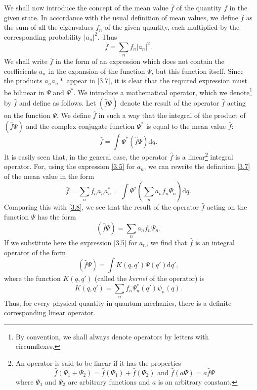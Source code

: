 We shall now introduce the concept of the mean value $ \bar{f} $ of the quantity $ f $ in the given state. In accordance with the usual definition of mean values, we define $ \bar{f} $ as the sum of all the eigenvalues $ f_n $ of the given quantity, each multiplied by the corresponding probability $ |a_n|^2 $. Thus
\begin{equation}\label{3.7}
\bar{f}=\sum_{n}f_n|a_n|^2.
\end{equation}
We shall write $ \bar{f} $ in the form of an expression which does not contain the coefficients $ a_n $ in the expansion of the function $ \Psi $, but this function itself. Since the products $ a_na_n* $ appear in \eqref{3.7}, it is clear that the required expression must be bilinear in $ \Psi $ and $ \Psi^* $. We introduce a mathematical operator, which we denote\footnote{By convention, we shall always denote operators by letters with circumflexes.
} by $ \hat{f} $ and define as follows. Let $ (\hat{f}\Psi) $ denote the result of the operator $ \hat{f} $ acting on the function $ \Psi $. We define $ \hat{f} $ in such a way that the integral of the product of $ (\hat{f}\Psi) $ and the complex conjugate function $ \Psi^* $ is equal to the mean value $ \bar{f} $:
\begin{equation}\label{3.8}
\bar{f}=\int\Psi^*(\hat{f}\Psi)\mathrm{d}q.
\end{equation}
It is easily seen that, in the general case, the operator $ \hat{f} $ is a linear\footnote{An operator is said to be linear if it has the properties
\[ \hat{f}(\Psi_1+\Psi_2)=\hat{f}(\Psi_1)+\hat{f}(\Psi_2)\text{ and }\hat{f}(a\Psi)=a\hat{f}\Psi \]
where $ \Psi_1 $ and $ \Psi_2 $ are arbitrary functions and $ a $ is an arbitrary constant.} integral operator. For, using the expression \eqref{3.5} for $ a_n $, we can rewrite the definition \eqref{3.7} of the mean value in the form
\[ \bar{f}=\sum_{n}f_na_na_n^*=\int\Psi^*(\sum_{n}a_nf_n\Psi_n)\mathrm{d}q. \]
Comparing this with \eqref{3.8}, we see that the result of the operator $ \hat{f} $ acting on the function $ \Psi $ has the form
\begin{equation}\label{3.9}
(\hat{f}\Psi)=\sum_{n}a_nf_n\Psi_n.
\end{equation}
If we substitute here the expression \eqref{3.5} for $ a_n $, we find that $ \hat{f} $ is an integral operator of the form
\begin{equation}\label{3.10}
(\hat{f}\Psi)=\int K(q,q')\Psi(q')\mathrm{d}q',
\end{equation}
where the function $ K(q, q') $ (called the \textit{kernel} of the operator) is
\begin{equation}\label{3.11}
K(q,q')=\sum_{n}f_n\Psi_n^*(q')\psi_n(q).
\end{equation}
Thus, for every physical quantity in quantum mechanics, there is a definite corresponding linear operator.


